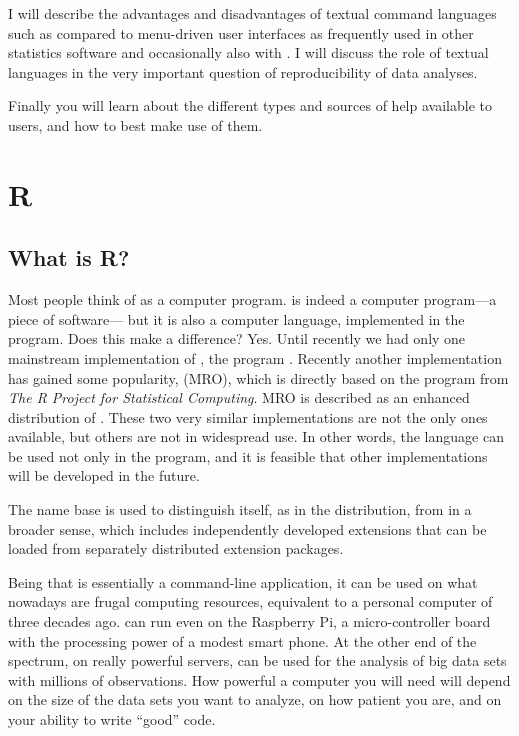 \documentclass[krantz2]{krantz}\usepackage{knitr}
\begin{document}
I will describe the advantages and disadvantages of textual command languages such as \Rlang compared to menu-driven user interfaces as frequently used in other statistics software and occasionally also with \Rlang. I will discuss the role of textual languages in the very important question of reproducibility of data analyses.

Finally you will learn about the different types and sources of help available to \Rlang users, and how to best make use of them.

\section{R}

\subsection{What is R?}

Most people think
of \Rpgrm as a computer program. \Rpgrm is indeed a computer program---a piece of software--- but it is also a computer language, implemented in the \Rpgrm program. Does this make a difference? Yes. Until recently we had only one mainstream implementation of \Rlang, the program \Rpgrm. Recently another implementation has gained some popularity,  (MRO), which is directly based on the \Rpgrm program from \textit{The R Project for Statistical Computing}. MRO is described as an enhanced distribution of \Rpgrm. These two very similar implementations are not the only ones available, but others are not in widespread use. In other words, the \Rlang language can be used not only in the \Rpgrm program, and it is feasible that other implementations will be developed in the future.

The name base \Rlang{} is used to distinguish \Rlang itself, as in the \Rpgrm distribution, from \Rlang in a broader sense, which includes independently developed extensions that can be loaded from separately distributed extension packages.

Being that \Rpgrm is essentially a command-line application, it can be used on what nowadays are frugal computing resources, equivalent to a personal computer of three decades ago. \Rpgrm can run even on the Raspberry Pi, a micro-controller board with the processing power of a modest smart phone. At the other end of the spectrum, on really powerful servers, \Rpgrm can be used for the analysis of big data sets with millions of observations. How powerful a computer you will need will depend on the size of the data sets you want to analyze, on how patient you are, and on your ability to write ``good'' code.
\end{document}
